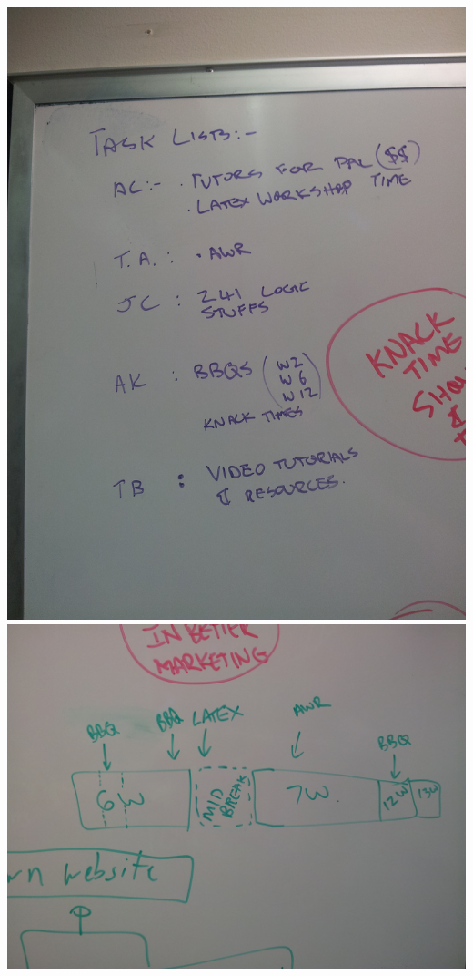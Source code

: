 \newpage
\includegraphics[angle=270, width=\textwidth]{img/IMG_20120706_181245.jpg}
\newpage
\includegraphics[angle=90, height=\textheight]{img/IMG_20120706_181250.jpg}
\\